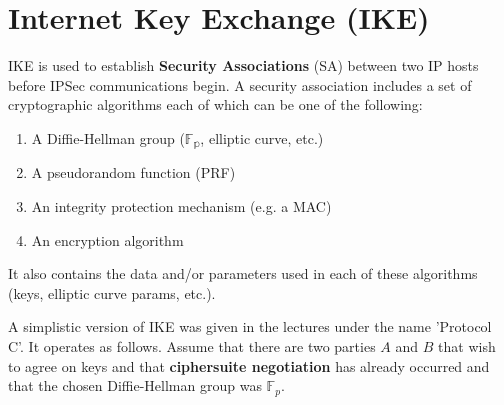 \documentclass[11pt]{report}
\begin{document}
\section{Internet Key Exchange (IKE)}
IKE is used to establish \textbf{Security Associations} (SA) between two IP hosts before IPSec communications begin. A security association includes a set of cryptographic algorithms each of which can be one of the following:

\begin{enumerate}
	\item A Diffie-Hellman group ($\mathbb{F_p}$, elliptic curve, etc.)
	\item A pseudorandom function (PRF)
	\item An integrity protection mechanism (e.g. a MAC)
	\item An encryption algorithm
\end{enumerate}

It also contains the data and/or parameters used in each of these algorithms (keys, elliptic curve params, etc.).

A simplistic version of IKE was given in the lectures under the name 'Protocol C'. It operates as follows. Assume that there are two parties $A$ and $B$ that wish to agree on keys and that \textbf{ciphersuite negotiation} has already occurred and that the chosen Diffie-Hellman group was $\mathbb{F}_p$.
\end{document}
